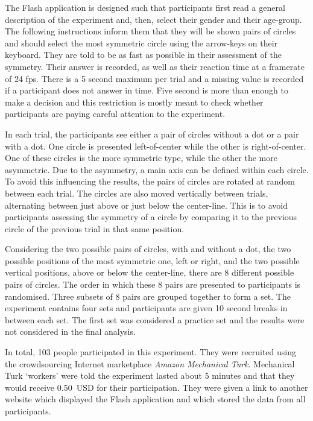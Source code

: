 \documentclass[a4paper,12pt]{article}
\numberwithin{equation}{section}
\begin{document}
The Flash application is designed such that participants first read a general description of the experiment and, then, select their gender and their age-group. The following instructions inform them that they will be shown pairs of circles and should select the most symmetric circle using the arrow-keys on their keyboard. They are told to be as fast as possible in their assessment of the symmetry. Their answer is recorded, as well as their reaction time at a framerate of 24 fps. There is a 5 second maximum per trial and a missing value is recorded if a participant does not answer in time. Five second is more than enough to make a decision and this restriction is mostly meant to check whether participants are paying careful attention to the experiment.

In each trial, the participants see either a pair of circles without a dot or a pair with a dot. One circle is presented left-of-center while the other is right-of-center. One of these circles is the more symmetric type, while the other the more asymmetric. Due to the asymmetry, a main axis can be defined within each circle. To avoid this influencing the results, the pairs of circles are rotated at random between each trial. The circles are also moved vertically between trials, alternating between just above or just below the center-line. This is to avoid participants assessing the symmetry of a circle by comparing it to the previous circle of the previous trial in that same position.

Considering the two possible pairs of circles, with and without a dot, the two possible positions of the most symmetric one, left or right, and the two possible vertical positions, above or below the center-line, there are 8 different possible pairs of circles. The order in which these 8 pairs are presented to participants is randomised. Three subsets of 8 pairs are grouped together to form a set. The experiment contains four sets and participants are given 10 second breaks in between each set. The first set was considered a practice set and the results were not considered in the final analysis.

In total, 103 people participated in this experiment. They were recruited using the crowdsourcing Internet marketplace \textit{Amazon Mechanical Turk}. Mechanical Turk `workers' were told the experiment lasted about 5 minutes and that they would receive 0.50~USD for their participation. They were given a link to another website which displayed the Flash application and which stored the data from all participants.
\end{document}
